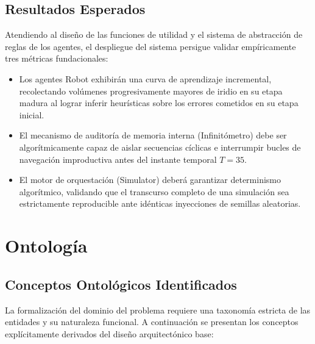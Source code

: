 \documentclass[conference]{IEEEtran}
\begin{document}
\subsection{Resultados Esperados}
Atendiendo al diseño de las funciones de utilidad y el sistema de abstracción de reglas de los agentes, el despliegue del sistema persigue validar empíricamente tres métricas fundacionales:
\begin{itemize}
    \item Los agentes Robot exhibirán una curva de aprendizaje incremental, recolectando volúmenes progresivamente mayores de iridio en su etapa madura al lograr inferir heurísticas sobre los errores cometidos en su etapa inicial.
    \item El mecanismo de auditoría de memoria interna (Infinitómetro) debe ser algorítmicamente capaz de aislar secuencias cíclicas e interrumpir bucles de navegación improductiva antes del instante temporal $T=35$.
    \item El motor de orquestación (Simulator) deberá garantizar determinismo algorítmico, validando que el transcurso completo de una simulación sea estrictamente reproducible ante idénticas inyecciones de semillas aleatorias.
\end{itemize}

\section{Ontología}

\subsection{Conceptos Ontológicos Identificados}
La formalización del dominio del problema requiere una taxonomía estricta de las entidades y su naturaleza funcional. A continuación se presentan los conceptos explícitamente derivados del diseño arquitectónico base:
\end{document}
